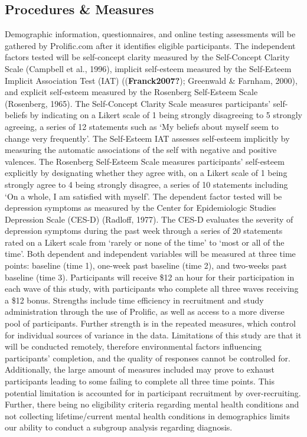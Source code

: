 \documentclass[
]{article}
\begin{document}
\subsection{Procedures \& Measures}\label{procedures-measures}

Demographic information, questionnaires, and online testing assessments
will be gathered by Prolific.com after it identifies eligible
participants. The independent factors tested will be self-concept
clarity measured by the Self-Concept Clarity Scale (Campbell et al.,
1996), implicit self-esteem measured by the Self-Esteem Implicit
Association Test (IAT) ((\textbf{Franck2007?}); Greenwald \& Farnham,
2000), and explicit self-esteem measured by the Rosenberg Self-Esteem
Scale (Rosenberg, 1965). The Self-Concept Clarity Scale measures
participants' self-beliefs by indicating on a Likert scale of 1 being
strongly disagreeing to 5 strongly agreeing, a series of 12 statements
such as `My beliefs about myself seem to change very frequently'. The
Self-Esteem IAT assesses self-esteem implicitly by measuring the
automatic associations of the self with negative and positive valences.
The Rosenberg Self-Esteem Scale measures participants' self-esteem
explicitly by designating whether they agree with, on a Likert scale of
1 being strongly agree to 4 being strongly disagree, a series of 10
statements including `On a whole, I am satisfied with myself'. The
dependent factor tested will be depression symptoms as measured by the
Center for Epidemiologic Studies Depression Scale (CES-D) (Radloff,
1977). The CES-D evaluates the severity of depression symptoms during
the past week through a series of 20 statements rated on a Likert scale
from `rarely or none of the time' to `most or all of the time'. Both
dependent and independent variables will be measured at three time
points: baseline (time 1), one-week past baseline (time 2), and
two-weeks past baseline (time 3). Participants will receive \$12 an hour
for their participation in each wave of this study, with participants
who complete all three waves receiving a \$12 bonus. Strengths include
time efficiency in recruitment and study administration through the use
of Prolific, as well as access to a more diverse pool of participants.
Further strength is in the repeated measures, which control for
individual sources of variance in the data. Limitations of this study
are that it will be conducted remotely, therefore environmental factors
influencing participants' completion, and the quality of responses
cannot be controlled for. Additionally, the large amount of measures
included may prove to exhaust participants leading to some failing to
complete all three time points. This potential limitation is accounted
for in participant recruitment by over-recruiting. Further, there being
no eligibility criteria regarding mental health conditions and not
collecting lifetime/current mental health conditions in demographics
limits our ability to conduct a subgroup analysis regarding diagnosis.
\end{document}
